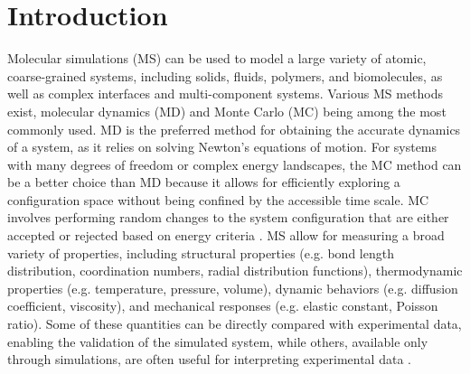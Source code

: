 \documentclass[9pt,tutorial]{livecoms}
\begin{document}
\section{Introduction}





Molecular simulations (MS) can be used to model a large variety of
atomic, coarse-grained systems, including solids, fluids, polymers, and
biomolecules, as well as complex interfaces and multi-component systems.
Various MS methods exist, molecular dynamics (MD) and Monte Carlo (MC)
being among the most commonly used.  MD is the preferred method for
obtaining the accurate dynamics of a system, as it relies on solving
Newton's equations of motion.  For systems with many degrees of freedom
or complex energy landscapes, the MC method can be a better choice than
MD because it allows for efficiently exploring a configuration space
without being confined by the accessible time scale.  MC involves
performing random changes to the system configuration that are either
accepted or rejected based on energy criteria
\cite{frenkel2023understanding, allen2017computer}.  MS allow for
measuring a broad variety of properties, including structural properties
(e.g. bond length distribution, coordination numbers, radial
distribution functions), thermodynamic properties (e.g. temperature,
pressure, volume), dynamic behaviors (e.g. diffusion coefficient,
viscosity), and mechanical responses (e.g. elastic constant, Poisson
ratio).  Some of these quantities can be directly compared with
experimental data, enabling the validation of the simulated system,
while others, available only through simulations, are often useful for
interpreting experimental data \cite{van2008molecular}.
\end{document}
